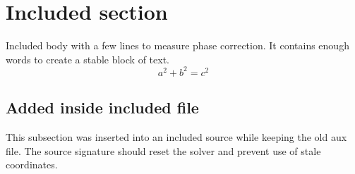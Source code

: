 \section{Included section}
Included body with a few lines to measure phase correction. It contains enough words to create a stable block of text.
\begin{equation} a^2+b^2=c^2 \end{equation}
\subsection{Added inside included file}
This subsection was inserted into an included source while keeping the old aux file. The source signature should reset the solver and prevent use of stale coordinates.

